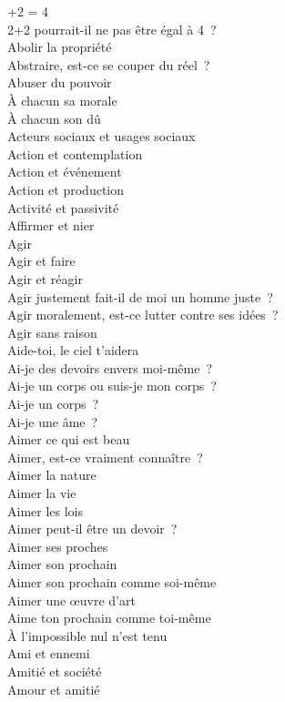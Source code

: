 \documentclass[a4paper,12pt]{article}
\begin{document}
+2 = 4 \\
2+2 pourrait-il ne pas être égal à 4 ? \\
Abolir la propriété \\
Abstraire, est-ce se couper du réel ? \\
Abuser du pouvoir \\
À chacun sa morale \\
À chacun son dû \\
Acteurs sociaux et usages sociaux \\
Action et contemplation \\
Action et événement \\
Action et production \\
Activité et passivité \\
Affirmer et nier \\
Agir \\
Agir et faire \\
Agir et réagir \\
Agir justement fait-il de moi un homme juste ? \\
Agir moralement, est-ce lutter contre ses idées ? \\
Agir sans raison \\
Aide-toi, le ciel t'aidera \\
Ai-je des devoirs envers moi-même ? \\
Ai-je un corps ou suis-je mon corps ? \\
Ai-je un corps ? \\
Ai-je une âme ? \\
Aimer ce qui est beau \\
Aimer, est-ce vraiment connaître ? \\
Aimer la nature \\
Aimer la vie \\
Aimer les lois \\
Aimer peut-il être un devoir ? \\
Aimer ses proches \\
Aimer son prochain \\
Aimer son prochain comme soi-même \\
Aimer une œuvre d'art \\
Aime ton prochain comme toi-même \\
À l'impossible nul n'est tenu \\
Ami et ennemi \\
Amitié et société \\
Amour et amitié \\
\end{document}
